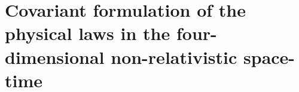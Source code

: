 \documentclass{article}
\theoremstyle{definition}
\theoremstyle{remark}
\begin{document}
\section{Covariant formulation of the physical laws in the
four-dimensional non-relativistic space-time}\label{CVFRM}
\end{document}
